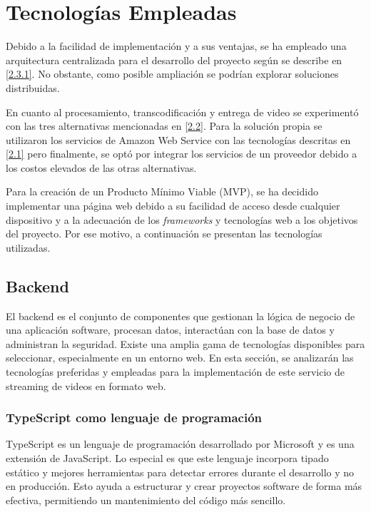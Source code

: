 \chapter{Tecnologías Empleadas}

Debido a la facilidad de implementación y a sus ventajas, se ha empleado una arquitectura centralizada para el desarrollo del proyecto según se describe en \ref{2.3.1}. No obstante, como posible ampliación se podrían explorar soluciones distribuidas.

En cuanto al procesamiento, transcodificación y entrega de video se experimentó con las tres alternativas mencionadas en \ref{2.2}. Para la solución propia se utilizaron los servicios de Amazon Web Service con las tecnologías descritas en \ref{2.1} pero finalmente, se optó por integrar los servicios de un proveedor debido a los costos elevados de las otras alternativas.

Para la creación de un Producto Mínimo Viable (MVP), se ha decidido implementar una página web debido a su facilidad de acceso desde cualquier dispositivo y a la adecuación de los \textit{frameworks} y tecnologías web a los objetivos del proyecto. Por ese motivo, a continuación se presentan las tecnologías utilizadas.


\section{Backend}

El backend es el conjunto de componentes que gestionan la lógica de negocio de una aplicación software, procesan datos, interactúan con la base de datos y administran la seguridad. Existe una amplia gama de tecnologías disponibles para seleccionar, especialmente en un entorno web. En esta sección, se analizarán las tecnologías preferidas y empleadas para la implementación de este servicio de streaming de videos en formato web.  

\subsection{TypeScript como lenguaje de programación}

TypeScript es un lenguaje de programación desarrollado por Microsoft y es una extensión de JavaScript. Lo especial es que este lenguaje incorpora tipado estático y mejores herramientas para detectar errores durante el desarrollo y no en producción. Esto ayuda a estructurar y crear proyectos software de forma más efectiva, permitiendo un mantenimiento del código más sencillo.


